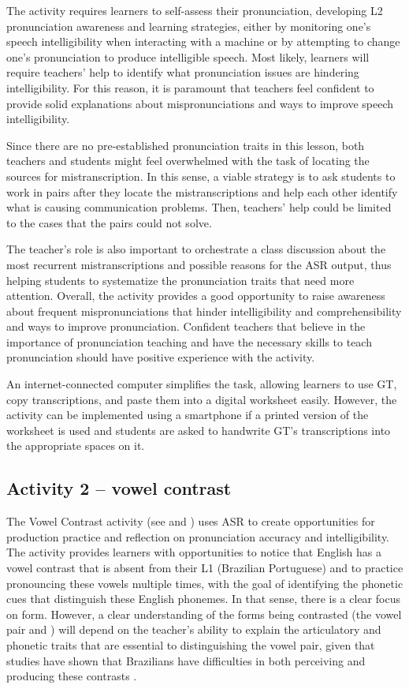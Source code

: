 \documentclass[english]{textolivre}
\begin{document}
The activity requires learners to self-assess their pronunciation,
developing L2 pronunciation awareness and learning strategies, either by
monitoring one's speech intelligibility when interacting with a machine
or by attempting to change one's pronunciation to produce intelligible
speech. Most likely, learners will require teachers' help to identify
what pronunciation issues are hindering intelligibility. For this
reason, it is paramount that teachers feel confident to provide solid
explanations about mispronunciations and ways to improve speech
intelligibility.


Since there are no pre-established pronunciation traits in this lesson,
both teachers and students might feel overwhelmed with the task of
locating the sources for mistranscription. In this sense, a viable
strategy is to ask students to work in pairs after they locate the
mistranscriptions and help each other identify what is causing
communication problems. Then, teachers' help could be limited to the
cases that the pairs could not solve.

The teacher's role is also important to orchestrate a class discussion
about the most recurrent mistranscriptions and possible reasons for the
ASR output, thus helping students to systematize the pronunciation
traits that need more attention. Overall, the activity provides a good
opportunity to raise awareness about frequent mispronunciations that
hinder intelligibility and comprehensibility and ways to improve
pronunciation. Confident teachers that believe in the importance of
pronunciation teaching and have the necessary skills to teach
pronunciation should have positive experience with the activity.

An internet-connected computer simplifies the task, allowing learners to
use GT, copy transcriptions, and paste them into a digital worksheet
easily. However, the activity can be implemented using a smartphone if a
printed version of the worksheet is used and students are asked to
handwrite GT's transcriptions into the appropriate spaces on it.

\subsection{Activity 2 -- vowel contrast}\label{sec-activity-2}

The Vowel Contrast activity (see  and ) uses ASR to
create opportunities for production practice and reflection on
pronunciation accuracy and intelligibility. The activity provides
learners with opportunities to notice that English has a vowel contrast
that is absent from their L1 (Brazilian Portuguese) and to practice
pronouncing these vowels multiple times, with the goal of identifying
the phonetic cues that distinguish these English phonemes. In that
sense, there is a clear focus on form. However, a clear understanding of
the forms being contrasted (the vowel pair  and ) will depend on
the teacher's ability to explain the articulatory and phonetic traits
that are essential to distinguishing the vowel pair, given that studies
have shown that Brazilians have difficulties in both perceiving and
producing these contrasts \cite{goncalves2014}.
\end{document}
